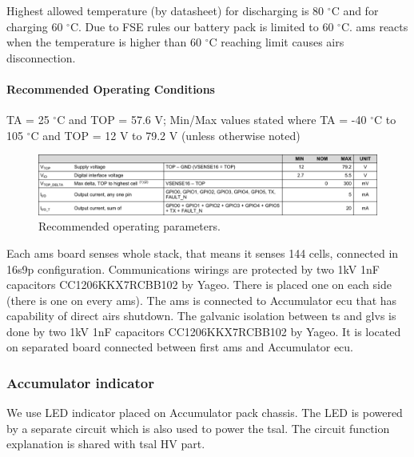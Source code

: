 Highest allowed temperature (by datasheet) for discharging is 80 $^\circ$C and for charging 60 $^\circ$C. Due to FSE rules our battery pack is limited to 60 $^\circ$C. \gls{ams} reacts when the temperature is higher than 60 $^\circ$C reaching limit causes \glspl{air} disconnection.

\paragraph{Recommended Operating Conditions}
TA = 25 $^\circ$C and TOP = 57.6 V; Min/Max values stated where TA = -40 $^\circ$C to 105 $^\circ$C and TOP = 12 V to 79.2 V (unless otherwise noted)
\begin{figure}[H]
	\centering
	\includegraphics[width=\textwidth]{./img/BMS-operatingparms.pdf}
	\caption{Recommended operating parameters.}
	\label{fig:BMS-op-params}
\end{figure}


Each \gls{ams} board senses whole stack, that means it senses 144 cells, connected in 16s9p configuration. Communications wirings are protected by two 1kV 1nF capacitors CC1206KKX7RCBB102 by Yageo. There is placed one on each side (there is one on every \gls{ams}). The \gls{ams} is connected to Accumulator \gls{ecu} that has capability of direct \glspl{air} shutdown. The galvanic isolation between \gls{ts} and \gls{glvs} is done by two 1kV 1nF capacitors CC1206KKX7RCBB102 by Yageo. It is located on separated board connected between first \gls{ams} and Accumulator \gls{ecu}.




\subsubsection{Accumulator indicator}

We use LED indicator placed on Accumulator pack chassis. The LED is powered by a separate circuit which is also used to power the \gls{tsal}. The circuit function explanation is shared with \gls{tsal} HV part. 


